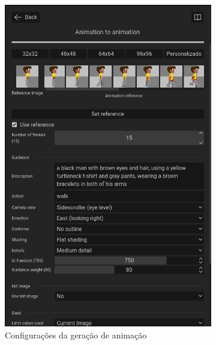 \begin{figure}[htbp]
    \centering
    \caption{\small Processo da utilização 9 da ferramenta de animação do PixelLab em julho/2025}
    \label{fig:pixelLabAnimacao9}

    \begin{subfigure}{0.6\linewidth}
        \includegraphics[width=1\linewidth]{figs/pixelLab/dia4/tela4_animarLimitando as cores.PNG}
        \caption{\small Configurações da geração de animação}
        \label{fig:pixelLabAnimacao9a}
    \end{subfigure}
    \begin{subfigure}{0.35\linewidth}

\end{subfigure}
\end{figure}
